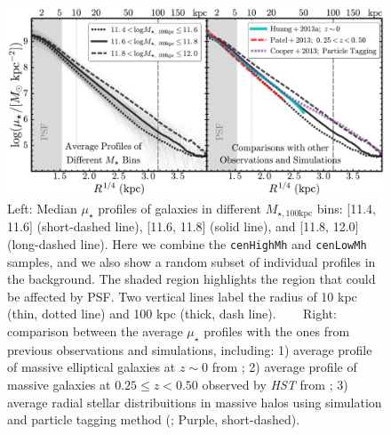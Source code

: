 \documentclass{emulateapj}
\def\rbcg{\texttt{cenHighMh}}
\def\nbcg{\texttt{cenLowMh}}
\def\mtot{{$M_{\star,100\mathrm{kpc}}$}}
\def\mden{{$\mu_{\star}$}}
\begin{document}
\begin{CJK*}{UTF8}{gbsn}

  \begin{figure}[bt!]
      \centering 
      \includegraphics[width=\textwidth]{fig/average_mass_profiles_fsps1_A}
      \caption{
      	Left: Median \mden{} profiles of galaxies in different \mtot{} bins:
      	[11.4, 11.6] (short-dashed line), [11.6, 11.8] (solid line), and 
      	[11.8, 12.0] (long-dashed line). 
      	Here we combine the \rbcg{} and \nbcg{} samples, and we also show a random subset 
      	of individual profiles in the background.
      	The shaded region highlights the region that could be affected by PSF.
        Two vertical lines label the radius of 10 kpc (thin, dotted line) and
        100 kpc (thick, dash line). ~~~ 
        Right: comparison between the average \mden{} profiles with the ones from 
        previous observations and simulations, including: 
        1) average profile of massive elliptical galaxies at $z\sim 0$ from 
        \citet[][Cyan, solid]{Huang2013a}; 
        2) average profile of massive galaxies at $0.25 \leq z < 0.50$ observed by 
        \textit{HST} from \citet[][Red, long-dashed]{Patel2013} ;
        3) average radial stellar distribuitions in massive halos using simulation and 
        particle tagging method (\citealt{Cooper13}; Purple, short-dashed).}
      \label{fig:avg_prof}
  \end{figure}


\end{CJK*}
\end{document}
